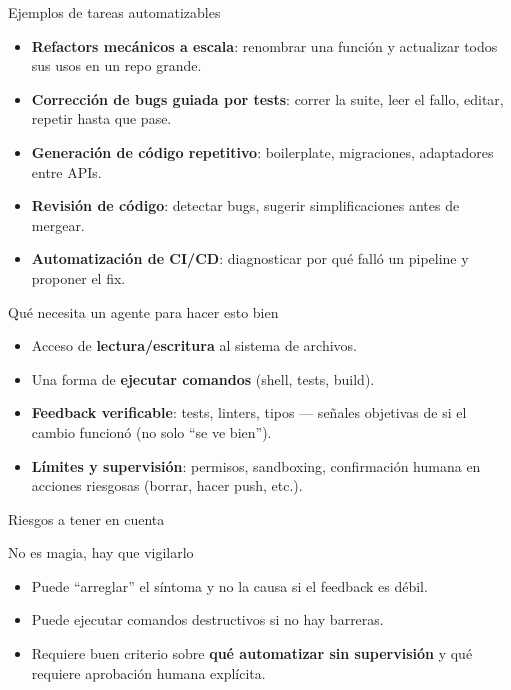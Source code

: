 \begin{frame}{Ejemplos de tareas automatizables}
  \small
  \begin{itemize}
    \item \textbf{Refactors mecánicos a escala}: renombrar una función y
      actualizar todos sus usos en un repo grande.
    \item \textbf{Corrección de bugs guiada por tests}: correr la suite,
      leer el fallo, editar, repetir hasta que pase.
    \item \textbf{Generación de código repetitivo}: boilerplate, migraciones,
      adaptadores entre APIs.
    \item \textbf{Revisión de código}: detectar bugs, sugerir simplificaciones
      antes de mergear.
    \item \textbf{Automatización de CI/CD}: diagnosticar por qué falló un
      pipeline y proponer el fix.
  \end{itemize}
\end{frame}

\begin{frame}{Qué necesita un agente para hacer esto bien}
  \begin{itemize}
    \item Acceso de \textbf{lectura/escritura} al sistema de archivos.
    \item Una forma de \textbf{ejecutar comandos} (shell, tests, build).
    \item \textbf{Feedback verificable}: tests, linters, tipos — señales
      objetivas de si el cambio funcionó (no solo ``se ve bien'').
    \item \textbf{Límites y supervisión}: permisos, sandboxing, confirmación
      humana en acciones riesgosas (borrar, hacer push, etc.).
  \end{itemize}
\end{frame}

\begin{frame}{Riesgos a tener en cuenta}
  \begin{alertblock}{No es magia, hay que vigilarlo}
    \begin{itemize}
      \item Puede ``arreglar'' el síntoma y no la causa si el feedback es débil.
      \item Puede ejecutar comandos destructivos si no hay barreras.
      \item Requiere buen criterio sobre \textbf{qué automatizar sin supervisión}
        y qué requiere aprobación humana explícita.
    \end{itemize}
  \end{alertblock}
\end{frame}
